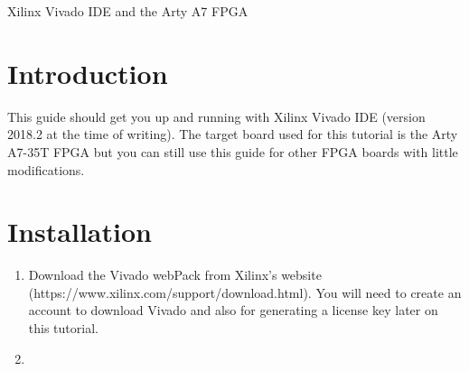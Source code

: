 \documentclass{article}
\begin{document}
\justify

\begin{center}
{\LARGE Xilinx Vivado IDE and the Arty A7 FPGA \par}
\end{center}



\section*{Introduction}
This guide should get you up and running with Xilinx Vivado IDE (version 2018.2 at the time of writing). 
The target board used for this tutorial is the Arty A7-35T FPGA but you can still use this guide for other 
FPGA boards with little modifications.

\section*{Installation}
  \begin{enumerate}
    \item Download the Vivado webPack from Xilinx's website (https://www.xilinx.com/support/download.html). 
    You will need to create an account to download Vivado and also for generating a license key later on this tutorial.
    
    \item 
  \end{enumerate}
\end{document}

